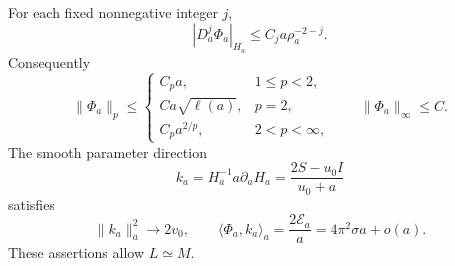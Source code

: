 \begin{proposition}\label{prop:residual}
For each fixed nonnegative integer \(j\),
\begin{equation}\label{eq:weighted-residual}
 |D_a^j\Phi_a|_{H_a}\le C_j a\rho_a^{-2-j}.
\end{equation}
Consequently
\begin{equation}\label{eq:residual-lp}
 \|\Phi_a\|_p\le
 \begin{cases}
  C_pa,&1\le p<2,\\
  Ca\sqrt{\ell(a)},&p=2,\\
  C_pa^{2/p},&2<p<\infty,
 \end{cases}
 \qquad \|\Phi_a\|_\infty\le C.
\end{equation}
The smooth parameter direction
\begin{equation}\label{eq:parameter-direction}
 k_a=H_a^{-1}a\partial_aH_a
     =\frac{2S-u_0I}{u_0+a}
\end{equation}
satisfies
\begin{equation}\label{eq:parameter-pairing}
 \|k_a\|_a^2\longrightarrow2v_0,\qquad
 \langle\Phi_a,k_a\rangle_a
 =\frac{2\mathcal E_a}{a}=4\pi^2\sigma a+o(a).
\end{equation}
These assertions allow \(L\simeq M\).
\end{proposition}

